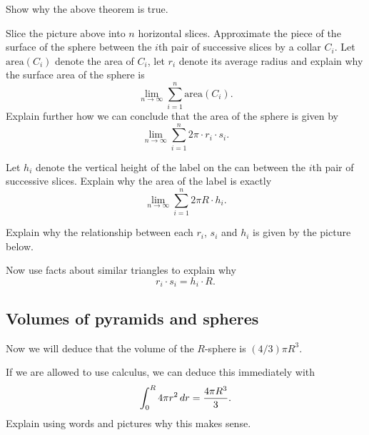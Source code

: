 \documentclass[hints,handout,noauthor,nooutcomes,12pt]{ximera}
\begin{document}
\begin{problem}
Show why the above theorem is true.

\begin{hint}
Slice the picture above into $n$ horizontal slices. Approximate the
piece of the surface of the sphere between the $i$th pair of
successive slices by a collar $C_{i}$. Let $\mathrm{area}( C_{i}) $
denote the area of $C_{i}$, let $r_{i}$ denote its average radius and
explain why the surface area of the sphere is
\[
\lim_{n\to \infty}\sum_{i=1}^{n} \mathrm{area}(C_i).
\]
Explain further how we can conclude that the area of the sphere is
given by
\[%
\lim_{n\to \infty}\sum_{i=1}^{n} 2\pi\cdot r_{i}\cdot s_{i}.
\]

\end{hint}
\begin{hint}
Let $h_{i}$ denote the vertical height of the label on the can between
the $i$th pair of successive slices. Explain why the area of the label is exactly%
\[%
\lim_{n\to\infty}\sum_{i=1}^{n} 2\pi R \cdot h_{i}.
\]
\end{hint}
\begin{hint}
Explain why the relationship between each $r_{i}$, $s_{i}$ and $h_{i}$
is given by the picture below.
\begin{image}
\end{image}
Now use facts about similar triangles to explain why
\[
r_{i}\cdot s_{i}=h_{i}\cdot R.
\]
\end{hint}
\end{problem}




\subsection{Volumes of pyramids and spheres}

Now we will deduce that the volume of the $R$-sphere is $(4/3) \pi
R^3$.

\begin{problem}
  If we are allowed to use calculus, we can deduce this immediately with
  \[
  \int_0^R 4\pi r^2 \,d r = \frac{4\pi R^3}{3}.
  \]
  Explain using words and pictures why this makes sense.
\end{problem}
\end{document}
